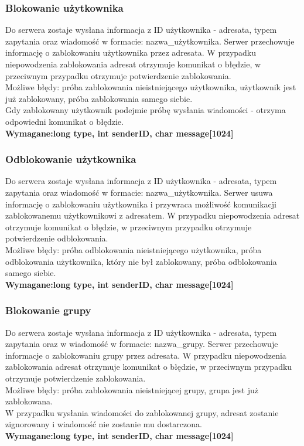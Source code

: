 \documentclass[11pt]{article}
\begin{document}
	\subsubsection{Blokowanie użytkownika}
	Do serwera zostaje wysłana informacja z ID użytkownika - adresata, typem zapytania oraz wiadomość w formacie: nazwa\_użytkownika. Serwer przechowuje informację o zablokowaniu użytkownika przez adresata. W przypadku niepowodzenia zablokowania adresat otrzymuje komunikat o błędzie, w przeciwnym przypadku otrzymuje potwierdzenie zablokowania.\\
	Możliwe błędy: próba zablokowania nieistniejącego użytkownika, użytkownik jest już zablokowany, próba zablokowania samego siebie.\\
	Gdy zablokowany użytkownik podejmie próbę wysłania wiadomości - otrzyma odpowiedni komunikat o błędzie. \\
	\textbf{Wymagane:long type, int senderID, char message[1024]}
	\subsubsection{Odblokowanie użytkownika}
	Do serwera zostaje wysłana informacja z ID użytkownika - adresata, typem zapytania oraz wiadomość w formacie: nazwa\_użytkownika. Serwer usuwa informację o zablokowaniu użytkownika i przywraca możliwość komunikacji zablokowanemu użytkownikowi z adresatem. W przypadku niepowodzenia adresat otrzymuje komunikat o błędzie, w przeciwnym przypadku otrzymuje potwierdzenie odblokowania.\\
	Możliwe błędy: próba odblokowania nieistniejącego użytkownika, próba odblokowania użytkownika, który nie był zablokowany, próba odblokowania samego siebie.\\
	\textbf{Wymagane:long type, int senderID, char message[1024] }
	\subsubsection{Blokowanie grupy}
	Do serwera zostaje wysłana informacja z ID użytkownika - adresata, typem zapytania oraz w wiadomość w formacie: nazwa\_grupy. Serwer przechowuje informacje o zablokowaniu grupy przez adresata. W przypadku niepowodzenia zablokowania adresat otrzymuje komunikat o błędzie, w przeciwnym przypadku otrzymuje potwierdzenie zablokowania.\\
	Możliwe błędy: próba zablokowania nieistniejącej grupy, grupa jest już zablokowana.\\
	W przypadku wysłania wiadomości do zablokowanej grupy, adresat zostanie zignorowany i wiadomość nie zostanie mu dostarczona.\\
	\textbf{Wymagane:long type, int senderID, char message[1024]}
\end{document}
